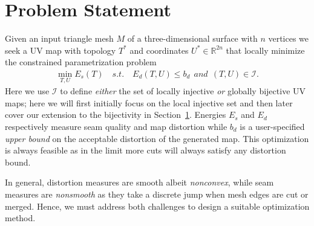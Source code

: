 
\section{Problem Statement}

Given an input triangle mesh $M$ of a three-dimensional surface with $n$ vertices we seek a UV map with topology $T^*$ and coordinates $U^* \in \mathbb{R}^{2n}$ that locally minimize 
the constrained parametrization problem
\begin{align}
	\min_{T,U} E_s(T) \quad s.t. \quad E_d(T,U) \leq b_d\ \ and\ \ (T, U) \in \mathcal{I}.
	\label{eq:p1}
\end{align}
 
%
Here we use $\mathcal{I}$ to define \emph{either} the set of locally injective \emph{or} globally bijective UV maps; here we will first initially focus on the local injective set and then later cover our extension to the bijectivity in Section\ \ref{}. Energies $E_s$ and $E_d$ respectively measure seam quality and map distortion while $b_d$ is a user-specified \emph{upper bound} on the acceptable distortion of the generated map. This optimization is always feasible as in the limit more cuts will always satisfy any distortion bound. %

In general, distortion measures are smooth albeit \emph{nonconvex}, while seam measures are \emph{nonsmooth} as they take a discrete jump when mesh edges are cut or merged. Hence, we must address both challenges to design a suitable optimization method. 

